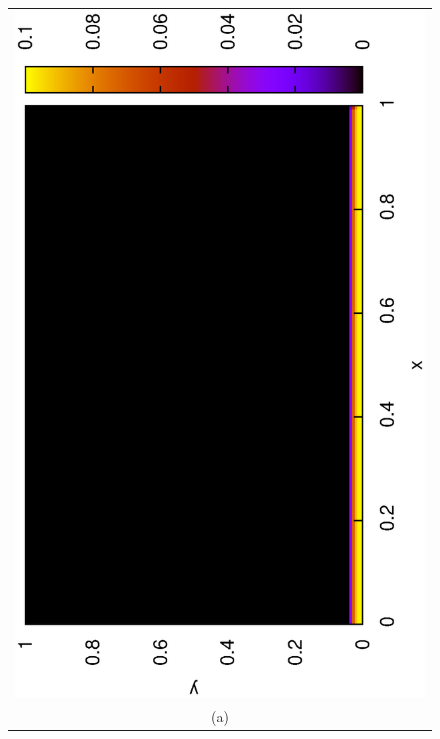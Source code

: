   \begin{figure}
    \centering
    \begin{tabular}{c}
      \includegraphics[scale = 0.5, angle = 270]{basic_trav_t0} \\
      (a) \\

\end{tabular}
\end{figure}
